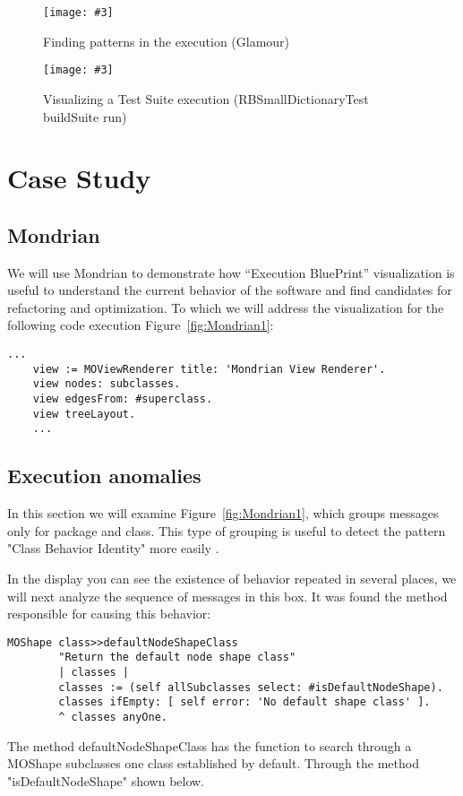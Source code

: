 \documentclass{sig-alternate}
\newcommand{\largefig}[4]{
	\begin{figure*}[#1]
		\centering
		\texttt{[image: \#3]}
		\caption{\label{fig:#3}#4}
	\end{figure*}}
\newcommand{\seclabel}[1]{\label{sec:#1}}
\newcommand{\figref}[1]{Figure~\ref{fig:#1}}
\begin{document}
\largefig{}{1.0}{ChaskiPreview11}{Finding patterns in the execution (Glamour)}
\largefig{}{1.0}{ChaskiPreview8}{Visualizing a Test Suite execution (RBSmallDictionaryTest buildSuite run)}
\section{Case Study}\seclabel{case study}

\subsection{Mondrian}

We will use Mondrian to demonstrate how ``Execution BluePrint'' visualization is useful to understand the current behavior of the software and find candidates for refactoring and optimization. To which we will address the visualization for the following code execution \figref{Mondrian1}:
\begin{lstlisting}[language=Smalltalk]
	...
	view := MOViewRenderer title: 'Mondrian View Renderer'.
	view nodes: subclasses.
	view edgesFrom: #superclass.
	view treeLayout.
	...
\end{lstlisting}

\subsection{Execution anomalies}

In this section we will examine \figref{Mondrian1}, which groups messages only for package and class. This type of grouping is useful to detect the pattern "Class Behavior Identity" more easily .

In the display you can see the existence of behavior repeated in several places, we  will next analyze the sequence of messages in this box. It was found the method responsible for causing this behavior:

\begin{lstlisting}[language=Smalltalk]
MOShape class>>defaultNodeShapeClass
		"Return the default node shape class"
		| classes |
		classes := (self allSubclasses select: #isDefaultNodeShape).
		classes ifEmpty: [ self error: 'No default shape class' ].
		^ classes anyOne.
\end{lstlisting} 

The method defaultNodeShapeClass has the function to search through a MOShape subclasses one class established by default. Through the method "isDefaultNodeShape" shown below.
\end{document}
